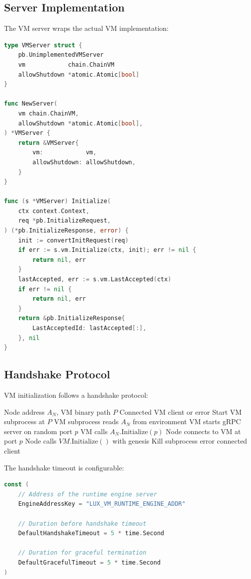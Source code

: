 \documentclass[11pt,letterpaper]{article}
\begin{document}
\subsection{Server Implementation}

The VM server wraps the actual VM implementation:

\begin{lstlisting}[language=Go, caption=Server Implementation]
type VMServer struct {
    pb.UnimplementedVMServer
    vm            chain.ChainVM
    allowShutdown *atomic.Atomic[bool]
}

func NewServer(
    vm chain.ChainVM,
    allowShutdown *atomic.Atomic[bool],
) *VMServer {
    return &VMServer{
        vm:            vm,
        allowShutdown: allowShutdown,
    }
}

func (s *VMServer) Initialize(
    ctx context.Context,
    req *pb.InitializeRequest,
) (*pb.InitializeResponse, error) {
    init := convertInitRequest(req)
    if err := s.vm.Initialize(ctx, init); err != nil {
        return nil, err
    }
    lastAccepted, err := s.vm.LastAccepted(ctx)
    if err != nil {
        return nil, err
    }
    return &pb.InitializeResponse{
        LastAcceptedId: lastAccepted[:],
    }, nil
}
\end{lstlisting}

\subsection{Handshake Protocol}

VM initialization follows a handshake protocol:

\begin{algorithm}
\caption{VM Handshake Protocol}
\label{alg:handshake}
\begin{algorithmic}[1]
\Require Node address $A_N$, VM binary path $P$
\Ensure Connected VM client or error
\State Start VM subprocess at $P$
\State VM subprocess reads $A_N$ from environment
\State VM starts gRPC server on random port $p$
\State VM calls $A_N.\text{Initialize}(p)$
\State Node connects to VM at port $p$
\State Node calls $VM.\text{Initialize}()$ with genesis
    \State Kill subprocess
    \State \Return error
\EndIf
\State \Return connected client
\end{algorithmic}
\end{algorithm}

The handshake timeout is configurable:

\begin{lstlisting}[language=Go, caption=Handshake Configuration]
const (
    // Address of the runtime engine server
    EngineAddressKey = "LUX_VM_RUNTIME_ENGINE_ADDR"

    // Duration before handshake timeout
    DefaultHandshakeTimeout = 5 * time.Second

    // Duration for graceful termination
    DefaultGracefulTimeout = 5 * time.Second
)
\end{lstlisting}
\end{document}
